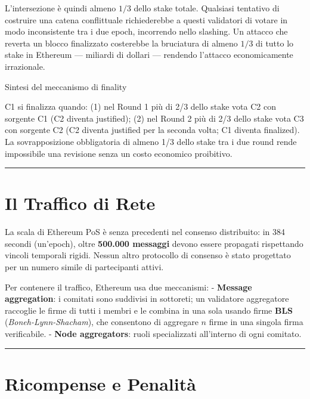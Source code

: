 \documentclass[
  italian,
  openany]{book}
\begin{document}
L'intersezione è quindi almeno \(1/3\) dello stake totale. Qualsiasi
tentativo di costruire una catena conflittuale richiederebbe a questi
validatori di votare in modo inconsistente tra i due epoch, incorrendo
nello slashing. Un attacco che reverta un blocco finalizzato costerebbe
la bruciatura di almeno \(1/3\) di tutto lo stake in Ethereum ---
miliardi di dollari --- rendendo l'attacco economicamente irrazionale.

\begin{calloutnote}{Sintesi del meccanismo di finality}

C1 si finalizza quando: (1) nel Round 1 più di 2/3 dello stake vota C2
con sorgente C1 (C2 diventa justified); (2) nel Round 2 più di 2/3 dello
stake vota C3 con sorgente C2 (C2 diventa justified per la seconda
volta; C1 diventa finalized). La sovrapposizione obbligatoria di almeno
1/3 dello stake tra i due round rende impossibile una revisione senza un
costo economico proibitivo.

\end{calloutnote}

\begin{center}\rule{0.5\linewidth}{0.5pt}\end{center}

\section{Il Traffico di Rete}\label{il-traffico-di-rete}

La scala di Ethereum PoS è senza precedenti nel consenso distribuito: in
384 secondi (un'epoch), oltre \textbf{500.000 messaggi} devono essere
propagati rispettando vincoli temporali rigidi. Nessun altro protocollo
di consenso è stato progettato per un numero simile di partecipanti
attivi.

Per contenere il traffico, Ethereum usa due meccanismi: -
\textbf{Message aggregation}: i comitati sono suddivisi in sottoreti; un
validatore aggregatore raccoglie le firme di tutti i membri e le combina
in una sola usando firme \textbf{BLS} (\emph{Boneh-Lynn-Shacham}), che
consentono di aggregare \(n\) firme in una singola firma verificabile. -
\textbf{Node aggregators}: ruoli specializzati all'interno di ogni
comitato.

\begin{center}\rule{0.5\linewidth}{0.5pt}\end{center}

\section{Ricompense e Penalità}\label{ricompense-e-penalituxe0}
\end{document}
